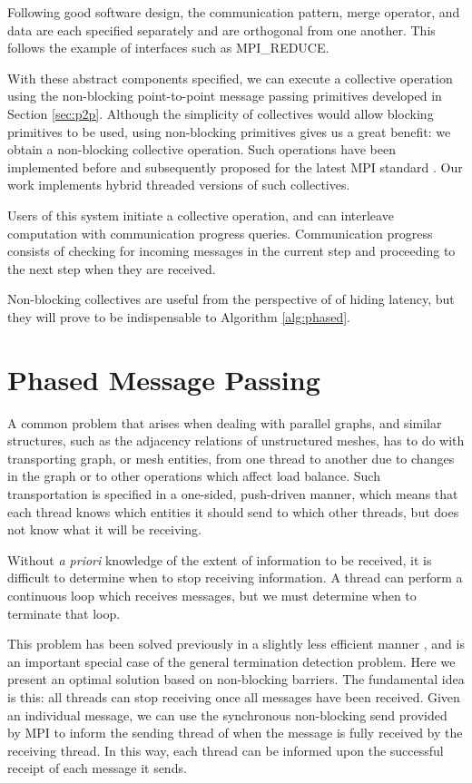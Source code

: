 \documentclass[final,1p,times]{elsarticle}
\begin{document}
Following good software design, the communication pattern,
merge operator, and data are each specified separately
and are orthogonal from one another.
This follows the example of interfaces such as MPI\_REDUCE.

With these abstract components specified, we can execute a collective
operation
using the non-blocking point-to-point message passing primitives
developed in Section \ref{sec:p2p}.
Although the simplicity of collectives would allow blocking primitives
to be used, using non-blocking primitives gives us a great benefit:
we obtain a non-blocking collective operation.
Such operations have been implemented before \cite{hoefler2007implementation}
and subsequently proposed for the latest MPI standard \cite{hoefler2006non}.
Our work implements hybrid threaded versions of such collectives.

Users of this system initiate a collective operation, and can interleave
computation with communication progress queries.
Communication progress consists of checking for incoming messages in the current
step and proceeding to the next step when they are received.

Non-blocking collectives are useful from the perspective of
of hiding latency, but they will prove to be indispensable to
Algorithm \ref{alg:phased}.

\section{Phased Message Passing}
\label{sec:phased}

A common problem that arises when dealing with parallel graphs,
and similar structures, such as the adjacency relations of unstructured
meshes, has to do with transporting graph, or mesh entities, from
one thread to another
due to changes in the graph or to other operations which affect
load balance.
Such transportation is specified in a one-sided,
push-driven manner, which means that each thread knows which
entities it should send to which other threads, but does
not know what it will be receiving.

Without {\it a priori} knowledge of the extent of information to be
received, it is difficult to determine when to stop receiving
information.
A thread can perform a continuous loop which receives messages,
but we must determine when to terminate that loop.

This problem has been solved previously in a slightly less efficient
manner \cite{Ovcharenko2012140}, and is an important special case
of the general termination detection problem.
Here we present an optimal solution based on non-blocking barriers.
The fundamental idea is this: all threads can stop receiving
once all messages have been received.
Given an individual message, we can use the synchronous non-blocking
send provided by MPI to inform the sending thread of when the message
is fully received by the receiving thread.
In this way, each thread can be informed upon the successful receipt
of each message it sends.
\end{document}
